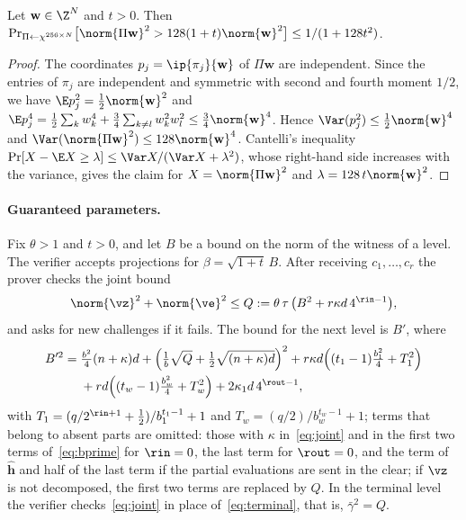 \begin{lemma}\label{lem:proj}
Let $\mathbf w\in\Z^N$ and $t>0$. Then $\Pr_{\Pi\leftarrow\chi^{256\times N}}\bigl[\norm{\Pi\mathbf w}^2>128(1+t)\norm{\mathbf w}^2\bigr]\le1/(1+128t^2)$.
\end{lemma}
\begin{proof}
The coordinates $p_j=\ip{\pi_j}{\mathbf w}$ of $\Pi\mathbf w$ are independent. Since the entries of $\pi_j$ are independent and symmetric with second and fourth moment $1/2$, we have $\E p_j^2=\frac12\norm{\mathbf w}^2$ and $\E p_j^4=\frac12\sum_kw_k^4+\frac34\sum_{k\ne l}w_k^2w_l^2\le\frac34\norm{\mathbf w}^4$. Hence $\Var(p_j^2)\le\frac12\norm{\mathbf w}^4$ and $\Var(\norm{\Pi\mathbf w}^2)\le128\norm{\mathbf w}^4$. Cantelli's inequality $\Pr[X-\E X\ge\lambda]\le\Var X/(\Var X+\lambda^2)$, whose right-hand side increases with the variance, gives the claim for $X=\norm{\Pi\mathbf w}^2$ and $\lambda=128\,t\norm{\mathbf w}^2$.
\end{proof}

\paragraph{Guaranteed parameters.}
Fix $\theta>1$ and $t>0$, and let $B$ be a bound on the norm of the witness of a level. The verifier accepts projections for $\beta=\sqrt{1+t}\,B$. After receiving $c_1,\dots,c_r$ the prover checks the joint bound
\begin{equation}\label{eq:joint}
\norm{\vz}^2+\norm{\ve}^2\le Q:=\theta\,\tau\,\bigl(B^2+r\kappa d\,4^{\rin-1}\bigr),
\end{equation}
and asks for new challenges if it fails. The bound for the next level is $B'$, where
\begin{equation}\label{eq:bprime}
\begin{aligned}
B'^2={}&\tfrac{b^2}{4}(n+\kappa)d+\Bigl(\tfrac1b\sqrt Q+\tfrac12\sqrt{(n+\kappa)d}\Bigr)^2+r\kappa d\Bigl((t_1-1)\tfrac{b_1^2}{4}+T_1^2\Bigr)\\
&+rd\Bigl((t_w-1)\tfrac{b_w^2}{4}+T_w^2\Bigr)+2\kappa_1d\,4^{\rout-1},
\end{aligned}
\end{equation}
with $T_1=(q/2^{\rin+1}+\frac12)/b_1^{t_1-1}+1$ and $T_w=(q/2)/b_w^{t_w-1}+1$; terms that belong to absent parts are omitted: those with $\kappa$ in~\eqref{eq:joint} and in the first two terms of~\eqref{eq:bprime} for $\rin=0$, the last term for $\rout=0$, and the term of $\hat{\mathbf h}$ and half of the last term if the partial evaluations are sent in the clear; if $\vz$ is not decomposed, the first two terms are replaced by $Q$. In the terminal level the verifier checks~\eqref{eq:joint} in place of~\eqref{eq:terminal}, that is, $\bar\gamma^2=Q$.

